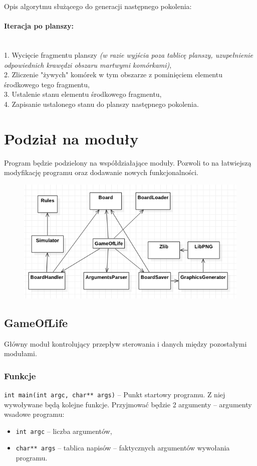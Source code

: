\documentclass{mwart}
\begin{document}
Opis algorytmu służącego do generacji następnego pokolenia:

\noindent\paragraph{Iteracja po planszy:}\mbox{}\\
	1. Wycięcie fragmentu planszy
		\textit{(w razie wyjścia poza tablicę planszy, uzupełnienie odpowiednich krawędzi obszaru martwymi komórkami)},\\
	2. Zliczenie "żywych" komórek w tym obszarze z pominięciem elementu środkowego tego fragmentu,\\
	3. Ustalenie stanu elementu środkowego fragmentu,\\
	4. Zapisanie ustalonego stanu do planszy następnego pokolenia.\\


\section{Podział na moduły}
Program będzie podzielony na współdziałające moduły. Pozwoli to na łatwiejszą modyfikację programu oraz dodawanie nowych funkcjonalności.

\begin{figure}
	\centering
	\def\svgwidth{\columnwidth}
	\includegraphics[width=13cm]{diagram_modolow.png}
\end{figure}	

\subsection{GameOfLife}
Główny moduł kontrolujący przepływ sterowania i danych między pozostałymi modułami.

\subsubsection{Funkcje}
\texttt{int main(int argc, char** args)} -- Punkt startowy programu. Z niej wywoływane będą kolejne funkcje. Przyjmować będzie 2 argumenty -- argumenty wsadowe programu:
\begin{itemize}[label={}]
	\item\texttt{int argc} -- liczba argumentów,
	\item\texttt{char** args} -- tablica napisów -- faktycznych argumentów wywołania programu.
\end{itemize}
\end{document}
